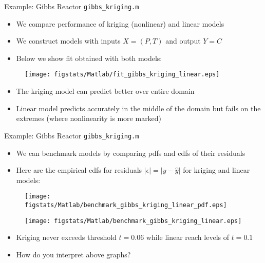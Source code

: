 \documentclass[9pt]{beamer}
\begin{document}
%
\begin{frame}{Example: Gibbs Reactor \footnotesize{\texttt{gibbs\_kriging.m}}}

\begin{itemize}
   \setlength{\itemsep}{10pt}
\item We compare performance of kriging (nonlinear) and linear models 
\item We construct models with inputs $X=(P,T)$ and output $Y=C$ 
\item Below we show fit obtained with both models: 
\end{itemize}

\begin{figure}[!htb]
    \centering
	\texttt{[image: figstats/Matlab/fit\_gibbs\_kriging\_linear.eps]}
\end{figure}

\begin{itemize}
   \setlength{\itemsep}{10pt}
\item The kriging model can predict better over entire domain
\item Linear model predicts accurately in the middle of the domain but fails on the extremes (where nonlinearity is more marked)
\end{itemize}

\end{frame}

%
\begin{frame}{Example: Gibbs Reactor \footnotesize{\texttt{gibbs\_kriging.m}}}

\begin{itemize}
   \setlength{\itemsep}{10pt}
\item We can benchmark models by comparing pdfs and cdfs of their residuals
\item Here are the empirical cdfs for residuals $|\epsilon|=|y-\hat{y}|$ for kriging and linear models:
\end{itemize}

\begin{figure}[!htb]
    \centering
	\texttt{[image: figstats/Matlab/benchmark\_gibbs\_kriging\_linear\_pdf.eps]}
\end{figure}
\begin{figure}[!htb]
    \centering
	\texttt{[image: figstats/Matlab/benchmark\_gibbs\_kriging\_linear.eps]}
\end{figure}

\begin{itemize}
   \setlength{\itemsep}{10pt}
\item Kriging never exceeds threshold $t=0.06$ while linear reach levels of $t=0.1$
\item How do you interpret above graphs? 
\end{itemize}

\end{frame}
\end{document}
